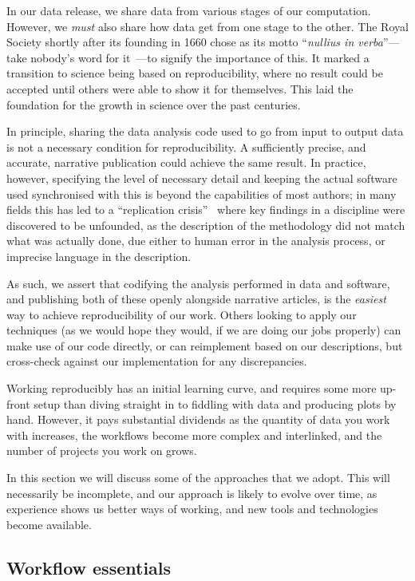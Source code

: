 \documentclass{article}
\newcommand\rfcword[1]{\emph{#1}\xspace}
\newcommand\must{\rfcword{must}}
\begin{document}
In our data release,
we share data from various stages of our computation.
However,
we \must also share how data get from one stage to the other.
The Royal Society shortly after its founding in 1660
chose as its motto ``\emph{nullius in verba}''---take
nobody's word for it~\cite{royal-society}---to
signify the importance of this.
It marked a transition to science being based on reproducibility,
where no result could be accepted until others were able to show it for themselves.
This laid the foundation for the growth in science over the past centuries.

In principle,
sharing the data analysis code used to go from input to output data
is not a necessary condition for reproducibility.
A sufficiently precise,
and accurate,
narrative publication
could achieve the same result.
In practice,
however,
specifying the level of necessary detail
and keeping the actual software used synchronised with this
is beyond the capabilities of most authors;
in many fields this has led to a ``replication crisis''~\cite{ioannidis2005most}
where key findings in a discipline were discovered to be unfounded,
as the description of the methodology did not match what was actually done,
due either to human error in the analysis process,
or imprecise language in the description.

As such,
we assert that codifying the analysis performed in data and software,
and publishing both of these openly alongside narrative articles,
is the \emph{easiest} way to achieve reproducibility of our work.
Others looking to apply our techniques
(as we would hope they would,
if we are doing our jobs properly)
can make use of our code directly,
or can reimplement based on our descriptions,
but cross-check against our implementation for any discrepancies.

Working reproducibly has an initial learning curve,
and requires some more up-front setup than diving straight in to
fiddling with data and producing plots by hand.
However,
it pays substantial dividends as the quantity of data you work with increases,
the workflows become more complex and interlinked,
and the number of projects you work on grows.

In this section we will discuss some of the approaches that we adopt.
This will necessarily be incomplete,
and our approach is likely to evolve over time,
as experience shows us better ways of working,
and new tools and technologies become available.

\subsection{Workflow essentials}
\label{sec:wf-essentials}
\end{document}
